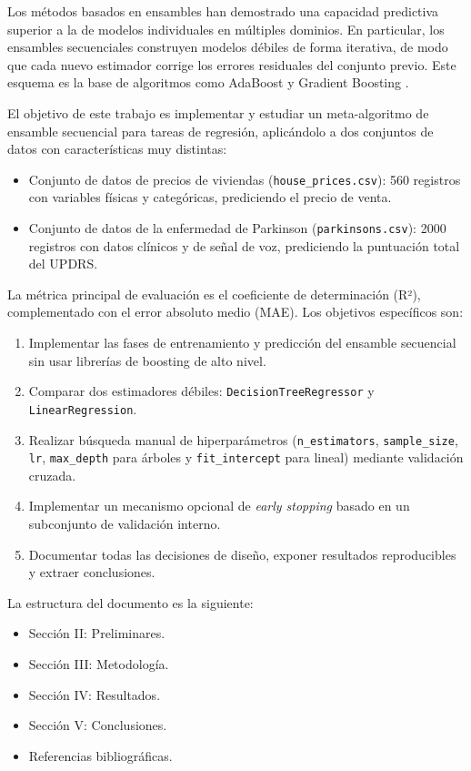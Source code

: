 \documentclass[conference,a4paper]{IEEEtran}
\begin{document}
Los métodos basados en ensambles han demostrado una capacidad predictiva superior a la de modelos individuales en múltiples dominios. En particular, los ensambles secuenciales construyen modelos débiles de forma iterativa, de modo que cada nuevo estimador corrige los errores residuales del conjunto previo. Este esquema es la base de algoritmos como AdaBoost y Gradient Boosting \cite{freund1997decision, friedman2001elements}.

El objetivo de este trabajo es implementar y estudiar un meta-algoritmo de ensamble secuencial para tareas de regresión, aplicándolo a dos conjuntos de datos con características muy distintas:
\begin{itemize}
    \item Conjunto de datos de precios de viviendas (\texttt{house\_prices.csv}): 560 registros con variables físicas y categóricas, prediciendo el precio de venta.
    \item Conjunto de datos de la enfermedad de Parkinson (\texttt{parkinsons.csv}): 2000 registros con datos clínicos y de señal de voz, prediciendo la puntuación total del UPDRS.
\end{itemize}

La métrica principal de evaluación es el coeficiente de determinación (R²), complementado con el error absoluto medio (MAE). Los objetivos específicos son:
\begin{enumerate}
    \item Implementar las fases de entrenamiento y predicción del ensamble secuencial sin usar librerías de boosting de alto nivel.
    \item Comparar dos estimadores débiles: \texttt{DecisionTreeRegressor} y \texttt{LinearRegression}.
    \item Realizar búsqueda manual de hiperparámetros (\texttt{n\_estimators}, \texttt{sample\_size}, \texttt{lr}, \texttt{max\_depth} para árboles y \texttt{fit\_intercept} para lineal) mediante validación cruzada.
    \item Implementar un mecanismo opcional de \emph{early stopping} basado en un subconjunto de validación interno.
    \item Documentar todas las decisiones de diseño, exponer resultados reproducibles y extraer conclusiones.
\end{enumerate}

La estructura del documento es la siguiente:
\begin{itemize}
    \item Sección II: Preliminares.
    \item Sección III: Metodología.
    \item Sección IV: Resultados.
    \item Sección V: Conclusiones.
    \item Referencias bibliográficas.
\end{itemize}
\end{document}
